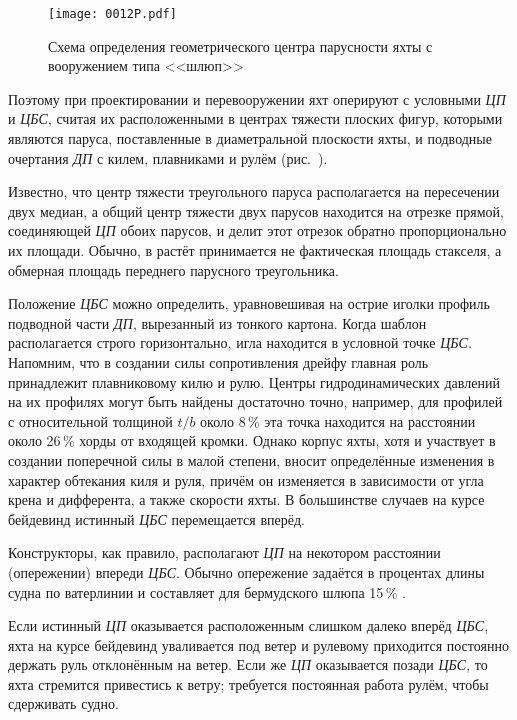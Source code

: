 \begin{figure}[htb]
  \centering
  \texttt{[image: 0012P.pdf]}
  \caption{Схема определения геометрического центра парусности яхты с вооружением типа <<шлюп>>}
  \label{fig:12}
\end{figure}

Поэтому при проектировании и перевооружении яхт оперируют с условными
\textit{ЦП} и \textit{ЦБС}, считая их расположенными в центрах тяжести
плоских фигур, которыми являются паруса, поставленные в диаметральной
плоскости яхты, и подводные очертания \textit{ДП} с килем, плавниками
и рулём (рис.~).

Известно, что центр тяжести треугольного паруса располагается на
пересечении двух медиан, а общий центр тяжести двух парусов находится
на отрезке прямой, соединяющей \textit{ЦП} обоих парусов, и делит этот
отрезок обратно пропорционально их площади. Обычно, в растёт
принимается не фактическая площадь стакселя, а обмерная площадь
переднего парусного треугольника.

Положение \textit{ЦБС} можно определить, уравновешивая на острие
иголки профиль подводной части \textit{ДП}, вырезанный из тонкого
картона. Когда шаблон располагается строго горизонтально, игла
находится в условной точке \textit{ЦБС}. Напомним, что в создании силы
сопротивления дрейфу главная роль принадлежит плавниковому килю и
рулю. Центры гидродинамических давлений на их профилях могут быть
найдены достаточно точно, например, для профилей с относительной
толщиной $t/b$ около 8\,\% эта точка находится на расстоянии около
26\,\% хорды от входящей кромки. Однако корпус яхты, хотя и участвует
в создании поперечной силы в малой степени, вносит определённые
изменения в характер обтекания киля и руля, причём он изменяется в
зависимости от угла крена и дифферента, а также скорости яхты. В
большинстве случаев на курсе бейдевинд истинный \textit{ЦБС}
перемещается вперёд.

Конструкторы, как правило, располагают \textit{ЦП} на некотором
расстоянии (опережении) впереди \textit{ЦБС}. Обычно опережение
задаётся в процентах длины судна по ватерлинии и составляет для
бермудского шлюпа 15\,\% \lkvl.

Если истинный \textit{ЦП} оказывается расположенным слишком далеко
вперёд \textit{ЦБС}, яхта на курсе бейдевинд уваливается под ветер и
рулевому приходится постоянно держать руль отклонённым на ветер. Если
же \textit{ЦП} оказывается позади \textit{ЦБС}, то яхта стремится
привестись к ветру; требуется постоянная работа рулём, чтобы
сдерживать судно.

